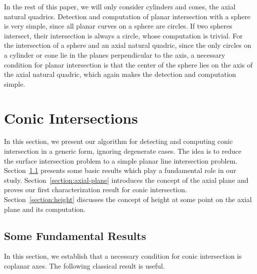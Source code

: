 \vspace{1em}

In the rest of this paper, we will only consider cylinders and cones,
the axial natural quadrics.
Detection and computation of planar intersection with a sphere is very simple,
since all planar curves on a sphere are circles.
If two spheres intersect, their intersection is always a circle,
whose computation is trivial.
For the intersection of a sphere and an axial natural quadric,
since the only circles on a cylinder or cone lie in the planes
perpendicular to the axis,
a necessary condition for planar intersection
is that the center of the sphere
lies on the axis of the axial natural quadric,
which again makes the detection and computation simple.


\section{Conic Intersections}
\label{section:conic}

     In this section, we present our algorithm for detecting and computing
conic intersection in a
generic form, ignoring degenerate cases.  The idea is to  reduce the surface
intersection problem to a simple planar line intersection problem.
Section~\ref{section:fundamental} presents some basic results which play a
fundamental role in our study.  Section~\ref{section:axial-plane} introduces
the concept of the axial plane and proves our first characterization result
for conic intersection.  Section~\ref{section:height} discusses the concept
of height at some point on the axial plane and its computation.



\subsection{Some Fundamental Results}
\label{section:fundamental}

     In this section, we establish that a necessary condition for conic
intersection is coplanar axes.  The following classical result is useful.

